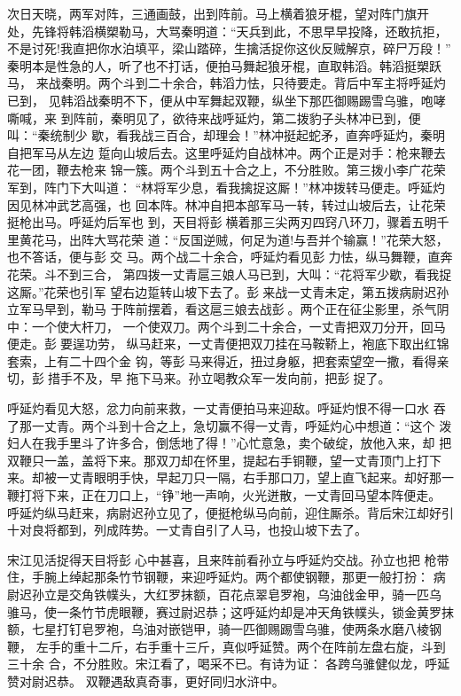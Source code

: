 次日天晓，两军对阵，三通画鼓，出到阵前。马上横着狼牙棍，望对阵门旗开
处，先锋将韩滔横槊勒马，大骂秦明道：“天兵到此，不思早早投降，还敢抗拒，
不是讨死!我直把你水泊填平，梁山踏碎，生擒活捉你这伙反贼解京，碎尸万段！”
秦明本是性急的人，听了也不打话，便拍马舞起狼牙棍，直取韩滔。韩滔挺槊跃马，
来战秦明。两个斗到二十余合，韩滔力怯，只待要走。背后中军主将呼延灼已到，
见韩滔战秦明不下，便从中军舞起双鞭，纵坐下那匹御赐踢雪乌骓，咆哮嘶喊，来
到阵前，秦明见了，欲待来战呼延灼，第二拨豹子头林冲已到，便叫：“秦统制少
歇，看我战三百合，却理会！”林冲挺起蛇矛，直奔呼延灼，秦明自把军马从左边
踅向山坡后去。这里呼延灼自战林冲。两个正是对手：枪来鞭去花一团，鞭去枪来
锦一簇。两个斗到五十合之上，不分胜败。第三拨小李广花荣军到，阵门下大叫道：
“林将军少息，看我擒捉这厮！”林冲拨转马便走。呼延灼因见林冲武艺高强，也
回本阵。林冲自把本部军马一转，转过山坡后去，让花荣挺枪出马。呼延灼后军也
到，天目将彭横着那三尖两刃四窍八环刀，骤着五明千里黄花马，出阵大骂花荣
道：“反国逆贼，何足为道!与吾并个输赢！”花荣大怒，也不答话，便与彭交
马。两个战二十余合，呼延灼看见彭力怯，纵马舞鞭，直奔花荣。斗不到三合，
第四拨一丈青扈三娘人马已到，大叫：“花将军少歇，看我捉这厮。”花荣也引军
望右边踅转山坡下去了。彭来战一丈青未定，第五拨病尉迟孙立军马早到，勒马
于阵前摆着，看这扈三娘去战彭。两个正在征尘影里，杀气阴中：一个使大杆刀，
一个使双刀。两个斗到二十余合，一丈青把双刀分开，回马便走。彭要逞功劳，
纵马赶来，一丈青便把双刀挂在马鞍鞒上，袍底下取出红锦套索，上有二十四个金
钩，等彭马来得近，扭过身躯，把套索望空一撒，看得亲切，彭措手不及，早
拖下马来。孙立喝教众军一发向前，把彭捉了。

呼延灼看见大怒，忿力向前来救，一丈青便拍马来迎敌。呼延灼恨不得一口水
吞了那一丈青。两个斗到十合之上，急切赢不得一丈青，呼延灼心中想道：“这个
泼妇人在我手里斗了许多合，倒恁地了得！”心忙意急，卖个破绽，放他入来，却
把双鞭只一盖，盖将下来。那双刀却在怀里，提起右手铜鞭，望一丈青顶门上打下
来。却被一丈青眼明手快，早起刀只一隔，右手那口刀，望上直飞起来。却好那一
鞭打将下来，正在刀口上，“铮”地一声响，火光迸散，一丈青回马望本阵便走。
呼延灼纵马赶来，病尉迟孙立见了，便挺枪纵马向前，迎住厮杀。背后宋江却好引
十对良将都到，列成阵势。一丈青自引了人马，也投山坡下去了。

宋江见活捉得天目将彭心中甚喜，且来阵前看孙立与呼延灼交战。孙立也把
枪带住，手腕上绰起那条竹节钢鞭，来迎呼延灼。两个都使钢鞭，那更一般打扮：
病尉迟孙立是交角铁幞头，大红罗抹额，百花点翠皂罗袍，乌油戗金甲，骑一匹乌
骓马，使一条竹节虎眼鞭，赛过尉迟恭；这呼延灼却是冲天角铁幞头，锁金黄罗抹
额，七星打钉皂罗袍，乌油对嵌铠甲，骑一匹御赐踢雪乌骓，使两条水磨八棱钢鞭，
左手的重十二斤，右手重十三斤，真似呼延赞。两个在阵前左盘右旋，斗到三十余
合，不分胜败。宋江看了，喝采不已。有诗为证：
各跨乌骓健似龙，呼延赞对尉迟恭。
双鞭遇敌真奇事，更好同归水浒中。

